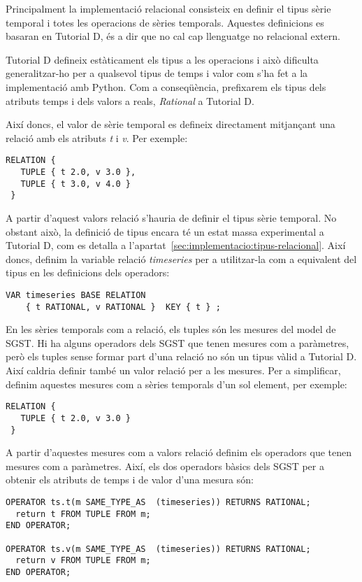 Principalment la implementació relacional consisteix en definir el
tipus sèrie temporal i totes les operacions de sèries
temporals. Aquestes definicions es basaran en Tutorial D, és a dir que
no cal cap llenguatge no relacional extern.

Tutorial D defineix estàticament els tipus a les operacions i això
dificulta generalitzar-ho per a qualsevol tipus de temps i valor com
s'ha fet a la implementació amb Python. Com a conseqüència, prefixarem
els tipus dels atributs temps i dels valors a reals, \emph{Rational} a
Tutorial D.

Així doncs, el valor de sèrie temporal es defineix directament
mitjançant una relació amb els atributs \emph{t} i \emph{v}. Per
exemple:
\begin{verbatim}
RELATION {
   TUPLE { t 2.0, v 3.0 },
   TUPLE { t 3.0, v 4.0 }
 }
\end{verbatim}


A partir d'aquest valors relació s'hauria de definir el tipus sèrie
temporal. No obstant això, la definició de tipus encara té un estat
massa experimental a Tutorial D, com es detalla a
l'apartat~\ref{sec:implementacio:tipus-relacional}. Així doncs,
definim la variable relació \emph{timeseries} per a utilitzar-la com a
equivalent del tipus en les definicions dels operadors:
\begin{verbatim}
VAR timeseries BASE RELATION
    { t RATIONAL, v RATIONAL }  KEY { t } ;
\end{verbatim}


En les sèries temporals com a relació, els tuples són les mesures del
model de SGST. Hi ha alguns operadors dels SGST que tenen mesures com
a paràmetres, però els tuples sense formar part d'una relació no són
un tipus vàlid a Tutorial D. Així caldria definir també un valor
relació per a les mesures. Per a simplificar, definim aquestes mesures
com a sèries temporals d'un sol element, per exemple:
\begin{verbatim}
RELATION {
   TUPLE { t 2.0, v 3.0 }
 }
\end{verbatim}


A partir d'aquestes mesures com a valors relació definim els operadors
que tenen mesures com a paràmetres. Així, els dos operadors bàsics
dels SGST per a obtenir els atributs de temps i de valor d'una mesura
són:
\begin{verbatim}
OPERATOR ts.t(m SAME_TYPE_AS  (timeseries)) RETURNS RATIONAL;
  return t FROM TUPLE FROM m;
END OPERATOR;

OPERATOR ts.v(m SAME_TYPE_AS  (timeseries)) RETURNS RATIONAL;
  return v FROM TUPLE FROM m;
END OPERATOR;
\end{verbatim}



